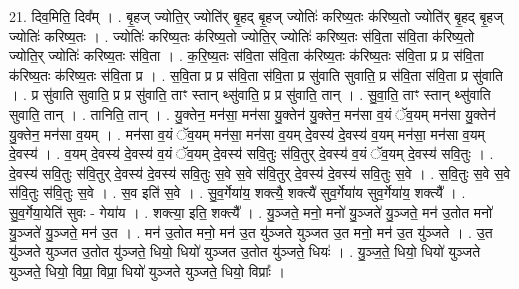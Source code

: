 \documentclass[17pt]{extarticle}
\begin{document}
21. दिव॒मिति॒ दिव᳚म् । . बृ॒हज् ज्योति॒र् ज्योति॑र् बृ॒हद् बृ॒हज् ज्योतिः॑ करिष्य॒तः क॑रिष्य॒तो ज्योति॑र् बृ॒हद् बृ॒हज् ज्योतिः॑ करिष्य॒तः । . ज्योतिः॑ करिष्य॒तः क॑रिष्य॒तो ज्योति॒र् ज्योतिः॑ करिष्य॒तः स॑वि॒ता स॑वि॒ता क॑रिष्य॒तो ज्योति॒र् ज्योतिः॑ करिष्य॒तः स॑वि॒ता । . क॒रि॒ष्य॒तः स॑वि॒ता स॑वि॒ता क॑रिष्य॒तः क॑रिष्य॒तः स॑वि॒ता प्र प्र स॑वि॒ता क॑रिष्य॒तः क॑रिष्य॒तः स॑वि॒ता प्र । . स॒वि॒ता प्र प्र स॑वि॒ता स॑वि॒ता प्र सु॑वाति सुवाति॒ प्र स॑वि॒ता स॑वि॒ता प्र सु॑वाति । . प्र सु॑वाति सुवाति॒ प्र प्र सु॑वाति॒ ताꣳ स्तान् थ्सु॑वाति॒ प्र प्र सु॑वाति॒ तान् । . सु॒वा॒ति॒ ताꣳ स्तान् थ्सु॑वाति सुवाति॒ तान् । . तानिति॒ तान् । . यु॒क्तेन॒ मन॑सा॒ मन॑सा यु॒क्तेन॑ यु॒क्तेन॒ मन॑सा व॒यं ॅव॒यम् मन॑सा यु॒क्तेन॑ यु॒क्तेन॒ मन॑सा व॒यम् । . मन॑सा व॒यं ॅव॒यम् मन॑सा॒ मन॑सा व॒यम् दे॒वस्य॑ दे॒वस्य॑ व॒यम् मन॑सा॒ मन॑सा व॒यम् दे॒वस्य॑ । . व॒यम् दे॒वस्य॑ दे॒वस्य॑ व॒यं ॅव॒यम् दे॒वस्य॑ सवि॒तुः स॑वि॒तुर् दे॒वस्य॑ व॒यं ॅव॒यम् दे॒वस्य॑ सवि॒तुः । . दे॒वस्य॑ सवि॒तुः स॑वि॒तुर् दे॒वस्य॑ दे॒वस्य॑ सवि॒तुः स॒वे स॒वे स॑वि॒तुर् दे॒वस्य॑ दे॒वस्य॑ सवि॒तुः स॒वे । . स॒वि॒तुः स॒वे स॒वे स॑वि॒तुः स॑वि॒तुः स॒वे । . स॒व इति॑ स॒वे । . सु॒व॒र्गेया॑य॒ शक्त्यै॒ शक्त्यै॑ सुव॒र्गेया॑य सुव॒र्गेया॑य॒ शक्त्यै᳚ । . सु॒व॒र्गेया॒येति॑ सुवः - गेया॑य । . शक्त्या॒ इति॒ शक्त्यै᳚ । . यु॒ञ्जते॒ मनो॒ मनो॑ यु॒ञ्जते॑ यु॒ञ्जते॒ मन॑ उ॒तोत मनो॑ यु॒ञ्जते॑ यु॒ञ्जते॒ मन॑ उ॒त । . मन॑ उ॒तोत मनो॒ मन॑ उ॒त यु॑ञ्जते युञ्जत उ॒त मनो॒ मन॑ उ॒त यु॑ञ्जते । . उ॒त यु॑ञ्जते युञ्जत उ॒तोत यु॑ञ्जते॒ धियो॒ धियो॑ युञ्जत उ॒तोत यु॑ञ्जते॒ धियः॑ । . यु॒ञ्ज॒ते॒ धियो॒ धियो॑ युञ्जते युञ्जते॒ धियो॒ विप्रा॒ विप्रा॒ धियो॑ युञ्जते युञ्जते॒ धियो॒ विप्राः᳚ । \newline
\end{document}
